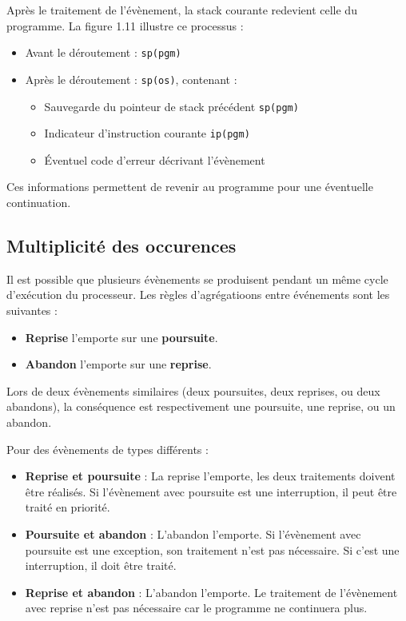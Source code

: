 Après le traitement de l’évènement, la stack courante redevient celle du programme. 
La figure 1.11 illustre ce processus :
\begin{itemize}
    \item Avant le déroutement : \texttt{sp(pgm)}
    \item Après le déroutement : \texttt{sp(os)}, contenant :
    \begin{itemize}
        \item Sauvegarde du pointeur de stack précédent \texttt{sp(pgm)}
        \item Indicateur d’instruction courante \texttt{ip(pgm)}
        \item Éventuel code d’erreur décrivant l’évènement
    \end{itemize}
\end{itemize}

Ces informations permettent de revenir au programme pour une éventuelle continuation.



\subsection{Multiplicité des occurences}

Il est possible que plusieurs évènements se produisent pendant un même cycle d’exécution du processeur. 
Les règles d'agrégatioons entre événements sont les suivantes :

\begin{itemize}
    \item \textbf{Reprise} l’emporte sur une \textbf{poursuite}.
    \item \textbf{Abandon} l’emporte sur une \textbf{reprise}.
\end{itemize}

Lors de deux évènements similaires (deux poursuites, deux reprises, ou deux abandons), la conséquence est respectivement une poursuite, une reprise, ou un abandon.

Pour des évènements de types différents :
\begin{itemize}
    \item \textbf{Reprise et poursuite} : La reprise l’emporte, les deux traitements doivent être réalisés. 
    Si l'évènement avec poursuite est une interruption, il peut être traité en priorité.
    \item \textbf{Poursuite et abandon} : L’abandon l’emporte. Si l'évènement avec poursuite est une exception, son traitement n'est pas nécessaire. 
    Si c'est une interruption, il doit être traité.
    \item \textbf{Reprise et abandon} : L’abandon l’emporte. Le traitement de l'évènement avec reprise n'est pas nécessaire car le programme ne continuera plus.
\end{itemize}



